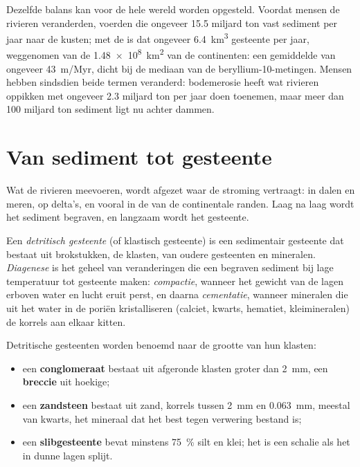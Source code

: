 Dezelfde balans kan voor de hele wereld worden opgesteld. Voordat mensen de
rivieren veranderden, voerden die ongeveer 15.5 miljard ton vast sediment per jaar naar
de kusten; met de  is dat ongeveer \qty{6.4}{km^3} gesteente per
jaar, weggenomen van de \qty{1.48e8}{km^2} van de continenten: een gemiddelde
 van ongeveer \qty{43}{m/Myr}, dicht bij de mediaan van de beryllium-10-metingen.
Mensen hebben sindsdien beide termen veranderd: bodemerosie heeft
wat rivieren oppikken met ongeveer 2.3 miljard ton per jaar doen toenemen, maar meer
dan 100 miljard ton sediment ligt nu achter dammen.

\section{Van sediment tot gesteente}

Wat de rivieren meevoeren, wordt afgezet waar de stroming vertraagt: in dalen en
meren, op delta's, en vooral in de  van de continentale
randen. Laag na laag wordt het sediment begraven, en langzaam wordt het
gesteente.

\begin{definition}\label{def:g12:destruction-of-mountains:diagenesis}
Een \emph{detritisch gesteente} (of klastisch gesteente) is een
sedimentair gesteente dat bestaat uit brokstukken, de klasten, van oudere gesteenten en mineralen.
\emph{Diagenese} is het geheel van veranderingen die een begraven
sediment bij lage temperatuur tot gesteente maken: \emph{compactie}, wanneer het gewicht van
de lagen erboven water en lucht eruit perst, en daarna \emph{cementatie}, wanneer
mineralen die uit het water in de poriën kristalliseren (calciet, kwarts,
hematiet, kleimineralen) de korrels aan elkaar kitten.
\end{definition}

Detritische gesteenten worden benoemd naar de grootte van hun klasten:
\begin{itemize}
  \item een \textbf{conglomeraat} bestaat uit afgeronde klasten groter dan
        \qty{2}{mm}, een \textbf{breccie} uit hoekige;
  \item een \textbf{zandsteen} bestaat uit zand, korrels tussen \qty{2}{mm}
        en \qty{0.063}{mm}, meestal van kwarts, het mineraal dat het best
        tegen verwering bestand is;
  \item een \textbf{slibgesteente} bevat minstens \qty{75}{\percent} silt en klei;
        het is een schalie als het in dunne lagen splijt.
\end{itemize}

